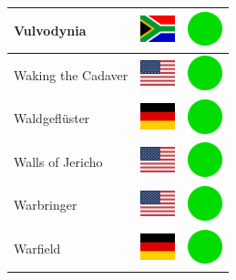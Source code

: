 \documentclass[12pt, a4paper, twoside]{report}
\begin{document}
\begin{center}
\begin{longtable}{|p{5cm}|p{2cm}|p{2cm}|}
 Vulvodynia                                                 & \includegraphics[width=1cm]{../img/flags/za} &   \includegraphics[width=1cm]{../likes/y} \\ \hline
 Waking the Cadaver                                         & \includegraphics[width=1cm]{../img/flags/us} &   \includegraphics[width=1cm]{../likes/y} \\ \hline
 Waldgeflüster                                              & \includegraphics[width=1cm]{../img/flags/de} &   \includegraphics[width=1cm]{../likes/y} \\ \hline
 Walls of Jericho                                           & \includegraphics[width=1cm]{../img/flags/us} &   \includegraphics[width=1cm]{../likes/y} \\ \hline
 Warbringer                                                 & \includegraphics[width=1cm]{../img/flags/us} &   \includegraphics[width=1cm]{../likes/y} \\ \hline
 Warfield                                                   & \includegraphics[width=1cm]{../img/flags/de} &   \includegraphics[width=1cm]{../likes/y} \\ \hline

\end{longtable}
\end{center}
\end{document}
